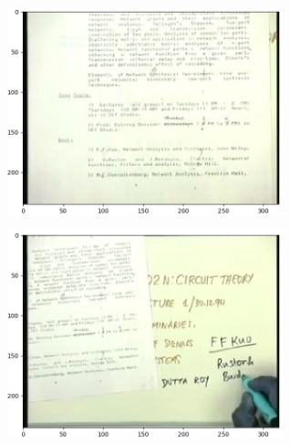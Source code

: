 \documentclass[journal]{IEEEtran}
\begin{document}
\begin{figure}[t]
	\centering

	\begin{subfigure}{0.49\textwidth}
		\centering
		\includegraphics[height = 6cm]{Images/frame.png}
	\end{subfigure}
	\hspace{1mm}
	\begin{subfigure}{0.49\textwidth}
		\centering
		\includegraphics[height = 6cm]{Images/frame1.png}
	\end{subfigure}


\end{figure}
\end{document}
